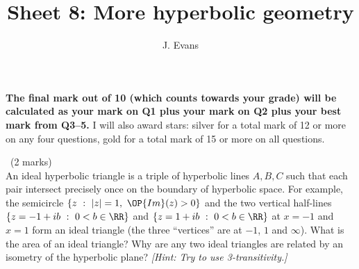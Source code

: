\documentclass[12pt]{article}
\title{Sheet 8: More hyperbolic geometry}
\author{J. Evans}
\date{}
\begin{document}
\maketitle

\bigskip

{\bf The final mark out of 10 (which counts towards your grade) will be calculated as your mark on Q1 plus your mark on Q2 plus your best mark from Q3--5.} I will also award stars: silver for a total mark of 12 or more on any four questions, gold for a total mark of 15 or more on all questions.

\vspace{1cm}

\begin{question}\ (2 marks)\\
An ideal hyperbolic triangle is a triple of hyperbolic lines $A,B,C$ such that each pair intersect precisely once on the boundary of hyperbolic space. For example, the semicircle $\{z\ :\ |z|=1,\ \OP{Im}(z)>0\}$ and the two vertical half-lines $\{z=-1+ib\ :\ 0<b\in\RR\}$ and $\{z=1+ib\ :\ 0<b\in\RR\}$ at $x=-1$ and $x=1$ form an ideal triangle (the three ``vertices'' are at $-1$, $1$ and $\infty$). What is the area of an ideal triangle? Why are any two ideal triangles are related by an isometry of the hyperbolic plane? {\em [Hint: Try to use 3-transitivity.]}
\end{question}

\iffalse
\begin{answer}
  The ideal triangle has internal angles equal to zero, so its area is $\pi-\alpha-\beta-\gamma=\pi$ (in other words, approximate it by a larger and larger sequence of actual triangles whose angles become smaller and smaller; in the limit the area tends to $\pi$). An ideal triangle is completely determined by its vertices. These vertices lie on $\RR\cup\{\infty\}$. For any three points $z_0,z_1,z_\infty$ in $\CC\cup\{\infty\}$ there is a M\"obius transformation taking them to $0,1,\infty$, namely
  \[\frac{z-z_0}{z-z_\infty}\frac{z_1-z_\infty}{z_1-z_0}.\]
  . If the three points are real then this M\"obius transformation is in $PGL(2,\RR)$. If necessary we can switch $z_0$ and $z_1$ to make the determinant of the corresponding $GL(2,\RR)$ matrix positive. So now we have a hyperbolic isometry taking the ideal triangle with vertices at $z_0,z_1,z_\infty$ to the ideal triangle with vertices at $0,1,\infty$.
\end{answer}
\newpage
\fi

\vspace{1cm}
\end{document}
